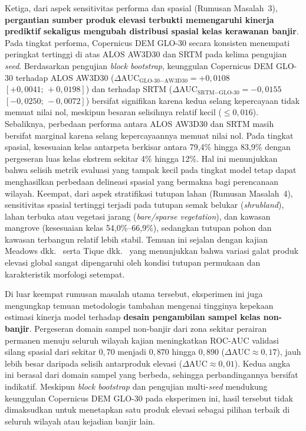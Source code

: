 \documentclass[12pt]{article}
\begin{document}
Ketiga, dari aspek sensitivitas performa dan spasial (Rumusan Masalah~3),
\textbf{pergantian sumber produk elevasi terbukti memengaruhi kinerja
prediktif sekaligus mengubah distribusi spasial kelas kerawanan banjir}. Pada
tingkat performa, Copernicus DEM GLO-30 secara konsisten menempati peringkat
tertinggi di atas ALOS AW3D30 dan SRTM pada kelima pengujian \textit{seed}.
Berdasarkan pengujian \textit{block bootstrap}, keunggulan Copernicus DEM
GLO-30 terhadap ALOS AW3D30 ($\Delta\text{AUC}_{\text{GLO-30}-\text{AW3D30}} =
+0{,}0108$ $[+0{,}0041;\,+0{,}0198]$) dan terhadap SRTM
($\Delta\text{AUC}_{\text{SRTM}-\text{GLO-30}} = -0{,}0155$
$[-0{,}0250;\,-0{,}0072]$) bersifat signifikan karena kedua selang kepercayaan
tidak memuat nilai nol, meskipun besaran selisihnya relatif kecil ($\leq
0{,}016$). Sebaliknya, perbedaan performa antara ALOS AW3D30 dan SRTM masih
bersifat marginal karena selang kepercayaannya memuat nilai nol. Pada tingkat
spasial, kesesuaian kelas antarpeta berkisar antara 79,4\% hingga 83,9\%
dengan pergeseran luas kelas ekstrem sekitar 4\% hingga 12\%. Hal ini
menunjukkan bahwa selisih metrik evaluasi yang tampak kecil pada tingkat model
tetap dapat menghasilkan perbedaan delineasi spasial yang bermakna bagi
perencanaan wilayah. Keempat, dari aspek stratifikasi tutupan lahan (Rumusan
Masalah~4), sensitivitas spasial tertinggi terjadi pada tutupan semak belukar
(\textit{shrubland}), lahan terbuka atau vegetasi jarang (\textit{bare/sparse
vegetation}), dan kawasan mangrove (kesesuaian kelas 54,0\%--66,9\%),
sedangkan tutupan pohon dan kawasan terbangun relatif lebih stabil. Temuan ini
sejalan dengan kajian Meadows dkk.\ \cite{meadows2024} serta Tique dkk.\
\cite{Tique2026} yang menunjukkan bahwa variasi galat produk elevasi global
sangat dipengaruhi oleh kondisi tutupan permukaan dan karakteristik morfologi
setempat.

Di luar keempat rumusan masalah utama tersebut, eksperimen ini juga mengungkap
temuan metodologis tambahan mengenai tingginya kepekaan estimasi kinerja model
terhadap \textbf{desain pengambilan sampel kelas non-banjir}. Pergeseran
domain sampel non-banjir dari zona sekitar perairan permanen menuju seluruh
wilayah kajian meningkatkan ROC-AUC validasi silang spasial dari sekitar
$0{,}70$ menjadi $0{,}870$ hingga $0{,}890$ ($\Delta\text{AUC} \approx
0{,}17$), jauh lebih besar daripada selisih antarproduk elevasi
($\Delta\text{AUC} \approx 0{,}01$). Kedua angka ini berasal dari domain
sampel yang berbeda, sehingga perbandingannya bersifat indikatif. Meskipun
\textit{block bootstrap} dan pengujian multi-\textit{seed} mendukung keunggulan
Copernicus DEM GLO-30 pada eksperimen ini, hasil tersebut tidak dimaksudkan
untuk menetapkan satu produk elevasi sebagai pilihan terbaik di seluruh
wilayah atau kejadian banjir lain.
\end{document}
